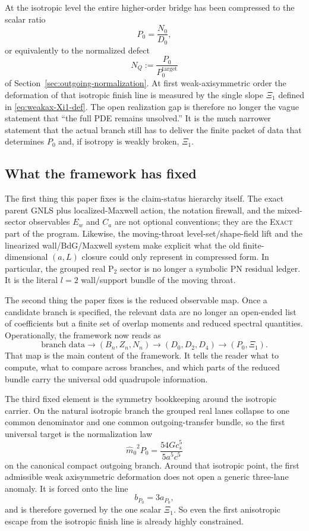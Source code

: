 \documentclass[11pt]{article}
\theoremstyle{definition}
\newcommand{\status}[1]{\textsc{#1}}
\newcommand{\Ptwo}{\ensuremath{\mathrm{P}_2}}
\newcommand{\mhat}{\ensuremath{\hat m_0}}
\newcommand{\XiOne}{\ensuremath{\Xi_1}}
\begin{document}
At the isotropic level the entire higher-order bridge has been compressed to the scalar ratio
\[
P_0=\frac{N_0}{D_0},
\]
or equivalently to the normalized defect
\[
N_Q:=\frac{P_0}{P_0^{\mathrm{target}}}
\]
of Section~\ref{sec:outgoing-normalization}. At first weak-axisymmetric order the deformation of that isotropic finish line is measured by the single slope \(\XiOne\) defined in \eqref{eq:weakax-Xi1-def}. The open realization gap is therefore no longer the vague statement that ``the full PDE remains unsolved.'' It is the much narrower statement that the actual branch still has to deliver the finite packet of data that determines \(P_0\) and, if isotropy is weakly broken, \(\XiOne\).

\subsection{What the framework has fixed}

The first thing this paper fixes is the claim-status hierarchy itself. The exact parent GNLS plus localized-Maxwell action, the notation firewall, and the mixed-sector observables \(E_w\) and \(C_a\) are not optional conventions; they are the \status{Exact} part of the program. Likewise, the moving-throat level-set/shape-field lift and the linearized wall/BdG/Maxwell system make explicit what the old finite-dimensional \((a,L)\) closure could only represent in compressed form. In particular, the grouped real \(\Ptwo\) sector is no longer a symbolic PN residual ledger. It is the literal \(l=2\) wall/support bundle of the moving throat.

The second thing the paper fixes is the reduced observable map. Once a candidate branch is specified, the relevant data are no longer an open-ended list of coefficients but a finite set of overlap moments and reduced spectral quantities. Operationally, the framework now reads as
\[
\text{branch data}
\longrightarrow
(B_n,Z_n,N_n)
\longrightarrow
(D_0,D_2,D_4)
\longrightarrow
(P_0,\XiOne).
\]
That map is the main content of the framework. It tells the reader what to compute, what to compare across branches, and which parts of the reduced bundle carry the universal odd quadrupole information.

The third fixed element is the symmetry bookkeeping around the isotropic carrier. On the natural isotropic branch the grouped real lanes collapse to one common denominator and one common outgoing-transfer bundle, so the first universal target is the normalization law
\begin{equation}
\mhat^{2}P_0=\frac{54Gc_s^5}{5a^5c^5}
\label{eq:discussion-canonical-normalization}
\end{equation}
on the canonical compact outgoing branch. Around that isotropic point, the first admissible weak axisymmetric deformation does not open a generic three-lane anomaly. It is forced onto the line
\[
b_{P_0}=3a_{P_0},
\]
and is therefore governed by the one scalar \(\XiOne\). So even the first anisotropic escape from the isotropic finish line is already highly constrained.
\end{document}
